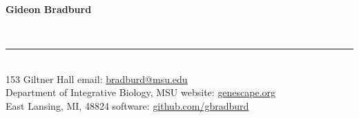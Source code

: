 \documentclass{article}
\begin{document}
\thispagestyle{empty}
%
\begin{huge}
\bf{Gideon Bradburd}\
\end{huge}
\vspace{-0.25cm}
\\
%
\vspace{-0.7cm}
\rule{470pt}{0.4pt}
\vspace{0.3cm}
%
\\
153 Giltner Hall \hfill email: \href{mailto:bradburd@msu.edu}{bradburd@msu.edu}\\
Department of Integrative Biology, MSU \hfill website: \href{http://genescape.org}{genescape.org}\\
East Lansing, MI, 48824 \hfill software: \href{https://github.com/gbradburd}{github.com/gbradburd}\\
\end{document}
